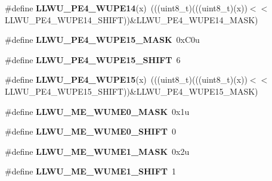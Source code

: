 \begin{DoxyCompactItemize}
\item 
\#define {\bfseries L\+L\+W\+U\+\_\+\+P\+E4\+\_\+\+W\+U\+P\+E14}(x)~(((uint8\+\_\+t)(((uint8\+\_\+t)(x))$<$$<$L\+L\+W\+U\+\_\+\+P\+E4\+\_\+\+W\+U\+P\+E14\+\_\+\+S\+H\+I\+FT))\&L\+L\+W\+U\+\_\+\+P\+E4\+\_\+\+W\+U\+P\+E14\+\_\+\+M\+A\+SK)\hypertarget{group__LLWU__Register__Masks_ga376a97009729f8dde435a783deb148d8}{}\label{group__LLWU__Register__Masks_ga376a97009729f8dde435a783deb148d8}

\item 
\#define {\bfseries L\+L\+W\+U\+\_\+\+P\+E4\+\_\+\+W\+U\+P\+E15\+\_\+\+M\+A\+SK}~0x\+C0u\hypertarget{group__LLWU__Register__Masks_ga53e48ffd153996ab89adb3c4df7511ee}{}\label{group__LLWU__Register__Masks_ga53e48ffd153996ab89adb3c4df7511ee}

\item 
\#define {\bfseries L\+L\+W\+U\+\_\+\+P\+E4\+\_\+\+W\+U\+P\+E15\+\_\+\+S\+H\+I\+FT}~6\hypertarget{group__LLWU__Register__Masks_gaeaf1e05b8de75133c46d6f11b3346732}{}\label{group__LLWU__Register__Masks_gaeaf1e05b8de75133c46d6f11b3346732}

\item 
\#define {\bfseries L\+L\+W\+U\+\_\+\+P\+E4\+\_\+\+W\+U\+P\+E15}(x)~(((uint8\+\_\+t)(((uint8\+\_\+t)(x))$<$$<$L\+L\+W\+U\+\_\+\+P\+E4\+\_\+\+W\+U\+P\+E15\+\_\+\+S\+H\+I\+FT))\&L\+L\+W\+U\+\_\+\+P\+E4\+\_\+\+W\+U\+P\+E15\+\_\+\+M\+A\+SK)\hypertarget{group__LLWU__Register__Masks_gadd015539f974ee2820707b9abf3787ba}{}\label{group__LLWU__Register__Masks_gadd015539f974ee2820707b9abf3787ba}

\item 
\#define {\bfseries L\+L\+W\+U\+\_\+\+M\+E\+\_\+\+W\+U\+M\+E0\+\_\+\+M\+A\+SK}~0x1u\hypertarget{group__LLWU__Register__Masks_ga5f1588218d510ac13093055708ceae49}{}\label{group__LLWU__Register__Masks_ga5f1588218d510ac13093055708ceae49}

\item 
\#define {\bfseries L\+L\+W\+U\+\_\+\+M\+E\+\_\+\+W\+U\+M\+E0\+\_\+\+S\+H\+I\+FT}~0\hypertarget{group__LLWU__Register__Masks_ga7f653f4ce89c4512437c0114f4659502}{}\label{group__LLWU__Register__Masks_ga7f653f4ce89c4512437c0114f4659502}

\item 
\#define {\bfseries L\+L\+W\+U\+\_\+\+M\+E\+\_\+\+W\+U\+M\+E1\+\_\+\+M\+A\+SK}~0x2u\hypertarget{group__LLWU__Register__Masks_ga99b29643134140d21a3d4259b7f64c86}{}\label{group__LLWU__Register__Masks_ga99b29643134140d21a3d4259b7f64c86}

\item 
\#define {\bfseries L\+L\+W\+U\+\_\+\+M\+E\+\_\+\+W\+U\+M\+E1\+\_\+\+S\+H\+I\+FT}~1\hypertarget{group__LLWU__Register__Masks_gac623d0db3076972370ee795830b555c1}{}\label{group__LLWU__Register__Masks_gac623d0db3076972370ee795830b555c1}


\end{DoxyCompactItemize}
